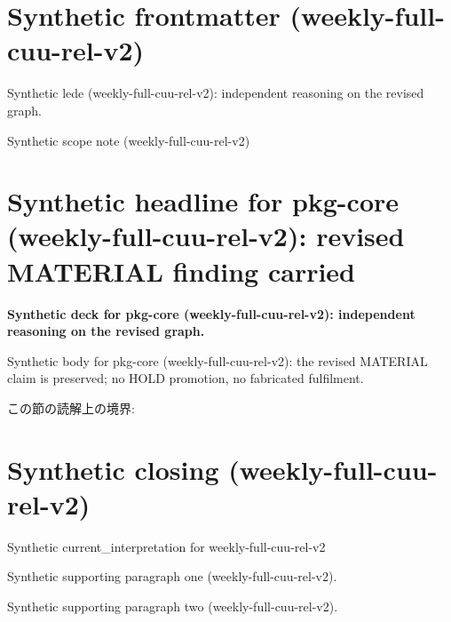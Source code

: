 \documentclass[lualatex,a4paper,10pt]{jlreq}
\begin{document}
\surveycover
\clearpage
\section*{Synthetic frontmatter (weekly-full-cuu-rel-v2)}
Synthetic lede (weekly-full-cuu-rel-v2): independent reasoning on the revised graph.

\begin{claimboundary}
\noindent Synthetic scope note (weekly-full-cuu-rel-v2)\par
\end{claimboundary}
\clearpage
\twocolumn
\section{Synthetic headline for pkg-core (weekly-full-cuu-rel-v2): revised MATERIAL finding carried}
\label{pkg:pkg-core}
\noindent\textbf{Synthetic deck for pkg-core (weekly-full-cuu-rel-v2): independent reasoning on the revised graph.} \cite{w2026-W33target-source}\par\medskip
\noindent Synthetic body for pkg-core (weekly-full-cuu-rel-v2): the revised MATERIAL claim is preserved; no HOLD promotion, no fabricated fulfilment.\par\medskip
\begin{claimboundary}
この節の読解上の境界: 
\end{claimboundary}
\clearpage
\onecolumn
\section{Synthetic closing (weekly-full-cuu-rel-v2)}
\label{sec:issue-summary}
\noindent Synthetic current\_interpretation for weekly-full-cuu-rel-v2\par\medskip
\noindent Synthetic supporting paragraph one (weekly-full-cuu-rel-v2).\par\medskip
\noindent Synthetic supporting paragraph two (weekly-full-cuu-rel-v2).\par\medskip
\clearpage
\onecolumn
\printbibliography[title={References / Source Notes}]
\end{document}
